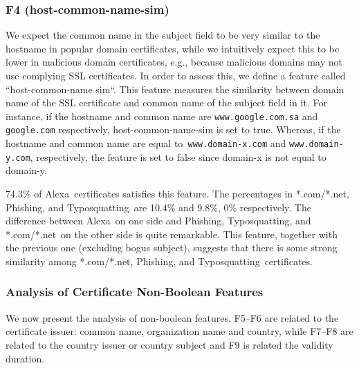 \documentclass[twocolumn]{article}
\newcommand{\Alexa}{\textsf{Alexa}}
\newcommand{\phishing}{\textsf{Phishing}}
\newcommand{\typosquatting}{\textsf{Typosquatting}}
\newcommand{\comnet}{\textsf{*.com/*.net}}
\begin{document}
\subsubsection*{F4 (host-common-name-sim)}\noindent 
We expect the common name in the subject field to be very similar to the hostname in popular domain certificates, while
we intuitively expect this to be lower in malicious domain certificates, e.g., because malicious domains may not use
complying SSL certificates. In order to assess this, we define a feature called ``host-common-name sim``. This feature 
measures the similarity between domain name of the SSL certificate and common name of the subject field in it.
For instance, if the hostname and common name are \texttt{www.google.com.sa} and \texttt{google.com} respectively, 
host-common-name-sim is set to true. Whereas, if the hostname and common name are equal 
to\texttt{ www.domain-x.com} and \texttt{www.domain-y.com}, respectively, the feature is set to false since domain-x is not equal to domain-y.


74.3\% of \Alexa\
certificates satisfies this feature. The percentages in  \comnet, \phishing, and \typosquatting\ are 10.4\% and 9.8\%, 0\%
respectively. The difference between \Alexa\ on one side and \phishing, \typosquatting, and \comnet\ on the other side is quite remarkable. 
This feature, together with the previous one (excluding bogus subject), suggests that there is some strong similarity among 
\comnet, \phishing, and \typosquatting\ certificates. 

\subsubsection{Analysis of Certificate Non-Boolean Features}
\label{non-boolean-analysis}
We now present the analysis of non-boolean features. F5--F6 are related to the certificate issuer:
common name, organization name and country, while F7--F8 are related to the country issuer or country subject and F9 is related the validity duration.
\end{document}
